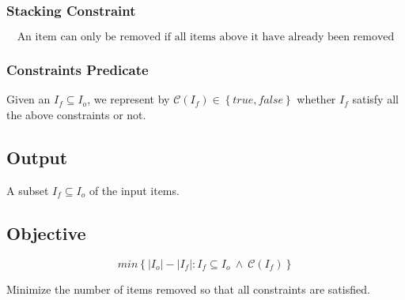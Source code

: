 \documentclass{article}
\newcommand{\true}{\ensuremath{true}\xspace}
\newcommand{\false}{\ensuremath{false}\xspace}
\newcommand{\abs}[1]{\ensuremath{\left| #1 \right|}\xspace}
\newcommand{\Set}[1]{\ensuremath{\left\{#1\right\}}}
\newcommand{\SetOf}[2]{\ensuremath{\left\{ #1 : #2 \right\}}\xspace}
\newcommand{\itemInput}{\ensuremath{\mathit{I}_{o}}\xspace}
\newcommand{\itemOutput}{\ensuremath{\mathit{I}_{f}}\xspace}
\newcommand{\constraintsPredicateSymbol}{\ensuremath{\mathscr{C}}\xspace}
\newcommand{\constraintsPredicate}[1]{\ensuremath{\constraintsPredicateSymbol \left( #1 \right)}\xspace}
\begin{document}
\subsubsection*{Stacking Constraint}
	\label{constraint:stacking}
\begin{equation}
	\mbox{An item can only be removed if all items above it have already been removed}
\end{equation}

\subsubsection*{Constraints Predicate}

Given an $\itemOutput \subseteq \itemInput$, we represent by $\constraintsPredicate{\itemOutput} \in \Set{\true, \false}$ whether \itemOutput satisfy all the above constraints or not.

\subsection{Output}

A subset $\itemOutput \subseteq \itemInput$ of the input items.

\subsection{Objective}

\begin{equation}
	min\SetOf{\abs{\itemInput} - \abs{\itemOutput}}{\itemOutput \subseteq \itemInput \ \land \ \constraintsPredicate{\itemOutput}}
\end{equation}

Minimize the number of items removed so that all constraints are satisfied.



\end{document}
